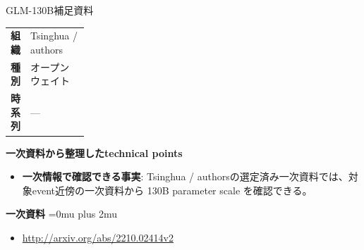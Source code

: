 \begin{technicalnote}{GLM-130B}{補足資料}
\begingroup
\begin{tabularx}{\linewidth}{@{}>{\bfseries}p{0.22\linewidth}X@{}}
組織 & Tsinghua / authors \\
種別 & オープンウェイト \\
時系列 & — \\
\end{tabularx}
\smallskip
{\bfseries 一次資料から整理したtechnical points}
\begin{itemize}[leftmargin=1.5em,itemsep=0.35em]
\item \textbf{一次情報で確認できる事実}: Tsinghua / authorsの選定済み一次資料では、対象event近傍の一次資料から 130B parameter scale を確認できる。
\end{itemize}
\begin{minipage}{\linewidth}
\begin{samepage}
{\bfseries 一次資料}
\begingroup\sloppy
\Urlmuskip=0mu plus 2mu\relax
\begin{itemize}[leftmargin=1.5em,itemsep=0.25em]
\item {\scriptsize\url{http://arxiv.org/abs/2210.02414v2}}
\end{itemize}
\endgroup
\end{samepage}
\end{minipage}
\endgroup
\end{technicalnote}
\medskip
